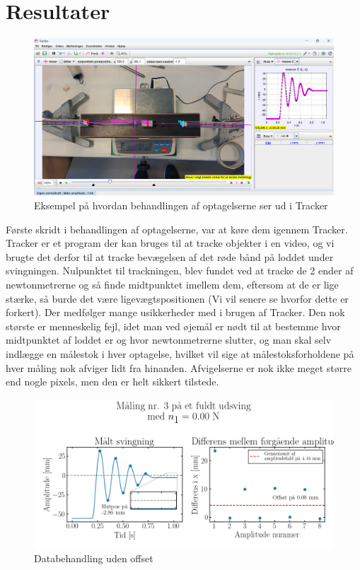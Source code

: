 \chapter{Resultater}
\begin{figure}[htbp]
    \centering
    \includegraphics[width=0.8\linewidth,origin=c]{figures/data_eksempel.png}
    \caption{Eksempel på hvordan behandlingen af optagelserne ser ud i Tracker}
    \label{fig:tracker}
\end{figure}
Første skridt i behandlingen af optagelserne, var at køre dem igennem Tracker. 
Tracker er et program der kan bruges til at tracke objekter i en video, 
og vi brugte det derfor til at tracke bevægelsen af det røde bånd på loddet under svingningen.
Nulpunktet til trackningen, blev fundet ved at tracke de 2 ender af newtonmetrerne og så finde midtpunktet imellem dem, 
eftersom at de er lige stærke, så burde det være ligevægtspositionen (Vi vil senere se hvorfor dette er forkert).
Der medfølger mange usikkerheder med i brugen af Tracker. Den nok største er menneskelig fejl, 
idet man ved øjemål er nødt til at bestemme hvor midtpunktet af loddet er og hvor newtonmetrerne slutter,
og man skal selv indlægge en målestok i hver optagelse, hvilket vil sige at målestoksforholdene på hver måling nok afviger lidt fra hinanden. 
Afvigelserne er nok ikke meget større end nogle pixels, men den er helt sikkert tilstede.
\begin{figure}[htbp]
    \centering
    \includegraphics[width=0.8\linewidth,origin=c]{figures/n0.00-maks3.png}
    \caption{Databehandling uden offset}
    \label{fig:dårlig_graf}
\end{figure}
